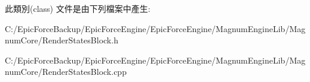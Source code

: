 此類別(class) 文件是由下列檔案中產生\+:\begin{DoxyCompactItemize}
\item 
C\+:/\+Epic\+Force\+Backup/\+Epic\+Force\+Engine/\+Epic\+Force\+Engine/\+Magnum\+Engine\+Lib/\+Magnum\+Core/Render\+States\+Block.\+h\item 
C\+:/\+Epic\+Force\+Backup/\+Epic\+Force\+Engine/\+Epic\+Force\+Engine/\+Magnum\+Engine\+Lib/\+Magnum\+Core/Render\+States\+Block.\+cpp\end{DoxyCompactItemize}
